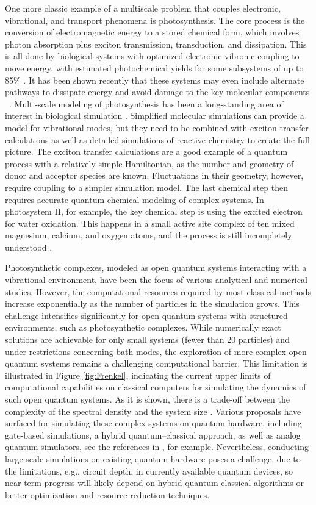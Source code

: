 One more classic example of a multiscale problem that couples electronic, vibrational, and transport phenomena is photosynthesis.  The core process is the conversion of electromagnetic energy to a stored chemical form, which involves photon absorption plus exciton transmission, transduction, and dissipation.  This is all done by biological systems with optimized electronic-vibronic coupling to move energy, with estimated photochemical yields for some subsystems of up to 85\% \cite{DEMMIGADAMS2003707}.  It has been shown recently that these systems may even include alternate pathways to dissipate energy and avoid damage to the key molecular components ~\cite{doi:10.1073/pnas.2018240118}.  
%
Multi-scale modeling of photosynthesis has been a long-standing area of interest in biological simulation \cite{ritz2002quantum}.  Simplified molecular simulations can provide a model for vibrational modes, but they need to be combined with exciton transfer calculations as well as detailed simulations of reactive chemistry to create the full picture.  The exciton transfer calculations are a good example of a quantum process with a relatively simple Hamiltonian, as the number and geometry of donor and acceptor species are known.  Fluctuations in their geometry, however, require coupling to a simpler simulation model.  The last chemical step then requires accurate quantum chemical modeling of complex systems.  In photosystem II, for example, the key chemical step is using the excited electron for water oxidation.  This happens in a small active site complex of ten mixed magnesium, calcium, and oxygen atoms, and the process is still incompletely understood \cite{Cox2020ARB}.

Photosynthetic complexes, modeled as open quantum systems interacting with a vibrational environment, have been the focus of various analytical and numerical studies. However, the computational resources required by most classical methods increase exponentially as the number of particles in the simulation grows. This challenge intensifies significantly for open quantum systems with structured environments, such as photosynthetic complexes. While numerically exact solutions are achievable for only small systems (fewer than 20 particles) and under restrictions concerning bath modes, the exploration of more complex open quantum systems remains a challenging computational barrier. This limitation is illustrated in Figure \ref{fig:Frenkel}, indicating the current upper limits of computational capabilities on classical computers for simulating the dynamics of such open quantum systems. As it is shown, there is a trade-off between the complexity of the spectral density and the system size \cite{Mostame2016}.
%
Various proposals have surfaced for simulating these complex systems on quantum hardware, including gate-based simulations, a hybrid quantum–classical approach, as well as analog quantum simulators, see the references in \cite{Jaderberg_2022}, for example. Nevertheless, conducting large-scale simulations on existing quantum hardware poses a challenge, due to the limitations, e.g., circuit depth, in currently available quantum devices, so near-term progress will likely depend on hybrid quantum-classical algorithms or better optimization and resource reduction techniques.


